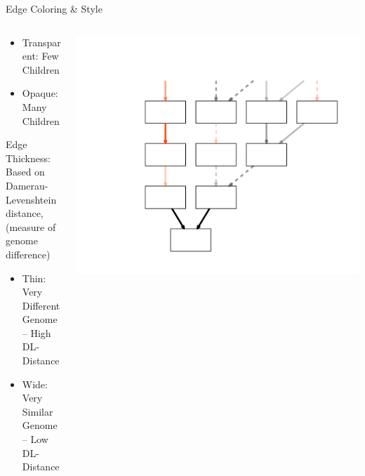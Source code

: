 \documentclass{beamer}
\begin{document}
\begin{frame}{Edge Coloring \& Style}
\begin{columns}
\begin{column}{.55\textwidth}
\begin{overprint}
\begin{itemize}
				\setlength\itemsep{1em}
					\item Transparent: Few Children
					\item Opaque: Many Children
				\end{itemize} 
				\hspace{.5cm} Edge Thickness: Based on \\ \vspace{.00cm}
                \hspace{0.75cm} Damerau-Levenshtein distance, \\ \vspace{.00cm}
                \hspace{0.75cm} (measure of genome difference) \vspace{.5em}
				\begin{itemize}
				\setlength\itemsep{1em}
					\item Thin: Very Different Genome \\ \hspace{.5cm} -- High DL-Distance 
					\item Wide: Very Similar Genome \\ \hspace{.5cm} -- Low DL-Distance
				\end{itemize}
		\end{overprint}
		\end{column}
		
		\begin{column}{.5\textwidth}
		\begin{overprint}
			 	\includegraphics[width=\textwidth]{Illustrations/family_edges.pdf} 
		\end{overprint}
		\end{column}
\end{columns}
\end{frame}
\end{document}
